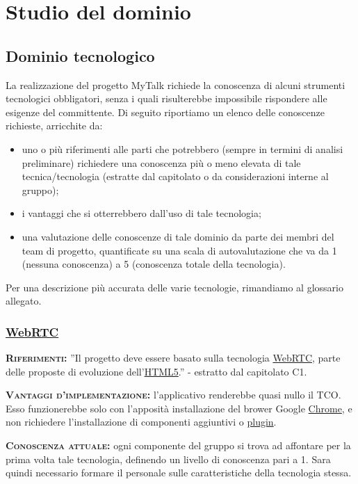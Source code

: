 \section{Studio del dominio}

\subsection{Dominio tecnologico}
La realizzazione del progetto MyTalk richiede la conoscenza di alcuni strumenti tecnologici obbligatori, senza i quali risulterebbe impossibile rispondere alle esigenze del committente. Di seguito riportiamo un elenco delle conoscenze richieste, arricchite da:

\begin{itemize}
	\item uno o più riferimenti alle parti che potrebbero (sempre in termini di analisi preliminare) richiedere una conoscenza più o meno elevata di tale tecnica/tecnologia (estratte dal capitolato o da considerazioni interne al gruppo);
	\item i vantaggi che si otterrebbero dall'uso di tale tecnologia;
	\item una valutazione delle conoscenze di tale dominio da parte dei membri del team di progetto, quantificate su una scala di autovalutazione che va da 1 (nessuna conoscenza) a 5 (conoscenza totale della tecnologia).
\end{itemize}
Per una descrizione più accurata delle varie tecnologie, rimandiamo al glossario allegato.

\subsubsection{\underline{WebRTC}}
\begin{description}
	\item{\scshape\bfseries Riferimenti:} ''Il progetto deve essere basato sulla tecnologia \underline{WebRTC}, parte delle proposte di evoluzione dell'\underline{HTML5}.'' - estratto dal capitolato C1.

	\item{\scshape\bfseries Vantaggi d'implementazione:} l'applicativo renderebbe quasi nullo il TCO. Esso funzionerebbe solo con l'apposità installazione del brower Google \underline{Chrome}, e non richiedere l'installazione di componenti aggiuntivi o \underline{plugin}.
	
	\item{\scshape\bfseries Conoscenza attuale:} ogni componente del gruppo si trova ad affontare per la prima volta tale tecnologia, definendo un livello di conoscenza pari a 1. Sara quindi necessario formare il personale sulle caratteristiche della tecnologia stessa.
\end{description}

